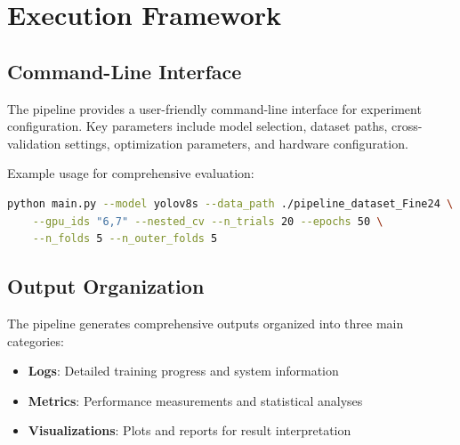 \section{Execution Framework}
\subsection{Command-Line Interface}

The pipeline provides a user-friendly command-line interface for experiment configuration. Key parameters include model selection, dataset paths, cross-validation settings, optimization parameters, and hardware configuration.

Example usage for comprehensive evaluation:
\begin{lstlisting}[language=bash]
python main.py --model yolov8s --data_path ./pipeline_dataset_Fine24 \
    --gpu_ids "6,7" --nested_cv --n_trials 20 --epochs 50 \
    --n_folds 5 --n_outer_folds 5
\end{lstlisting}

\subsection{Output Organization}

The pipeline generates comprehensive outputs organized into three main categories:

\begin{itemize}
    \item \textbf{Logs}: Detailed training progress and system information
    \item \textbf{Metrics}: Performance measurements and statistical analyses
    \item \textbf{Visualizations}: Plots and reports for result interpretation
\end{itemize}
